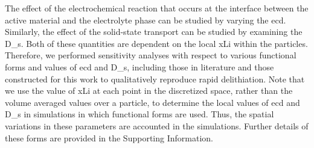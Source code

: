 \documentclass{article}
\begin{document}
The effect of the electrochemical reaction that occurs at the
interface between the active material and the electrolyte phase can be
studied by varying the \gls{ecd}. Similarly, the effect
of the solid-state transport can be studied by examining the
\gls{D_s}. Both of these quantities are dependent on the
local \gls{xLi} within the particles. Therefore, we
performed sensitivity analyses with respect to various functional
forms and values of \gls{ecd} and \gls{D_s}, including those in
literature\cite{chueh2021,amin2015,moshtev1984,newman1993,newman1994-2,newman1995-2,newman1996,mukherjee2017,chiang2020,tsai2018,dees2008}
and those constructed for this work to qualitatively reproduce rapid
delithiation. Note that we use the value of \gls{xLi} at each point in
the discretized space, rather than the volume averaged values over a
particle, to determine the local values of \gls{ecd} and \gls{D_s} in
simulations in which functional forms are used. Thus, the spatial
variations in these parameters are accounted in the
simulations. Further details of these forms are provided in the
Supporting Information.
\end{document}
